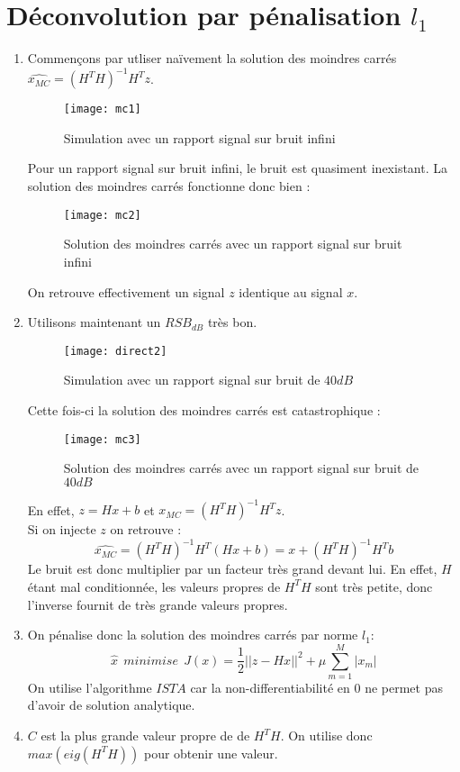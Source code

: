 \documentclass[12pt,a4paper,titlepage]{article}
\begin{document}
\section{Déconvolution par pénalisation $l_1$}
	\begin{enumerate}
		\item{Commençons par utliser naïvement la solution des moindres carrés $\hat{x_{MC}}=(H^TH)^{-1}H^Tz$.
		\begin{figure}[H]
    			\texttt{[image: mc1]}
		    	\centering
			\caption{Simulation avec un rapport signal sur bruit infini}
		\end{figure}
		Pour un rapport signal sur bruit infini, le bruit est quasiment inexistant. La solution des moindres carrés fonctionne donc bien :
		\begin{figure}[H]
    			\texttt{[image: mc2]}
		    	\centering
			\caption{Solution des moindres carrés avec un rapport signal sur bruit infini}
		\end{figure}
		On retrouve effectivement un signal $z$ identique au signal $x$.
		}
		\item{Utilisons maintenant un $RSB_{dB}$ très bon.
		\begin{figure}[H]
    			\texttt{[image: direct2]}
		    	\centering
			\caption{Simulation avec un rapport signal sur bruit de $40dB$}
		\end{figure}
		Cette fois-ci la solution des moindres carrés est catastrophique :
		\begin{figure}[H]
    			\texttt{[image: mc3]}
		    	\centering
			\caption{Solution des moindres carrés avec un rapport signal sur bruit de $40dB$}
		\end{figure}
		En effet, $z=Hx+b$ et $\hat{x_{MC}}=(H^TH)^{-1}H^Tz$. \\
		Si on injecte $z$ on retrouve :
		$$
		\hat{x_{MC}}=(H^TH)^{-1}H^T(Hx+b)=x+(H^TH)^{-1}H^Tb
		$$
		Le bruit est donc multiplier par un facteur très grand devant lui. En effet, $H$ étant mal conditionnée, les valeurs propres de $H^TH$ sont très petite, donc l'inverse fournit de très grande valeurs propres.
		}
		\item{
		On pénalise donc la solution des moindres carrés par norme $l_1$:
		$$
		\hat{x} \ \ minimise \ \ J(x) = \frac{1}{2}|| z-Hx ||^2+ \mu \sum_{m=1}^M|x_m|
		$$
		On utilise l'algorithme $ISTA$ car la non-differentiabilité en $0$ ne permet pas d'avoir de solution analytique.
		}
		\item{$C$ est la plus grande valeur propre de de $H^TH$. On utilise donc $max(eig(H^TH))$ pour obtenir une valeur.}

\end{enumerate}
\end{document}
